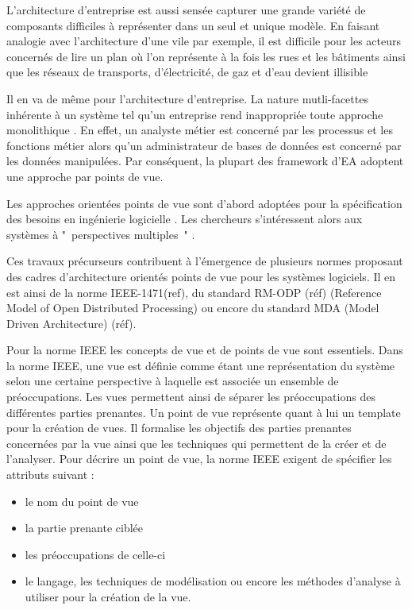 L'architecture d'entreprise est aussi sensée capturer une grande variété de composants difficiles à représenter dans un seul et unique modèle. 
En faisant analogie avec l'architecture d'une vile par exemple, il est difficile pour les acteurs concernés de lire un plan où l'on représente à la fois les rues et les bâtiments ainsi que les réseaux de transports, d'électricité, de gaz et d'eau devient illisible 

Il en va de même pour l'architecture d'entreprise. La nature mutli-facettes inhérente à un système tel qu'un entreprise rend inappropriée toute approche monolithique \cite{armour1999bigpicture}. En effet, un analyste métier est concerné par les 
processus et les fonctions métier alors qu'un administrateur de bases de données 
est concerné par les données manipulées. Par conséquent, la plupart des 
framework d'EA adoptent une approche par points de vue.

Les approches orientées points de vue sont d'abord adoptées pour la 
spécification des besoins en ingénierie logicielle \cite{mullery1979core}. Les 
chercheurs s'intéressent alors aux systèmes à "~perspectives multiples~" 
\cite{finkelstein1992viewpoints} \cite{kotonya1996requirements} 
\cite{nuseibeh1994multi} \cite{meyers1993representing}. 

Ces travaux précurseurs contribuent à l'émergence de plusieurs normes proposant 
des cadres d'architecture orientés points de vue pour les systèmes logiciels. Il 
en est ainsi de la norme IEEE-1471(ref), du standard RM-ODP (réf) (Reference 
Model of Open Distributed Processing) ou encore du standard MDA (Model Driven 
Architecture) (réf).

Pour la norme IEEE les concepts de vue et de points de vue sont 
essentiels. 
Dans la norme IEEE, une vue est définie comme étant une représentation du système selon une certaine perspective à laquelle est associée un ensemble de préoccupations. Les vues 
permettent ainsi de séparer les préoccupations des différentes parties 
prenantes. Un point de vue représente quant à lui un template pour la création de 
vues. Il formalise les objectifs des parties prenantes concernées par la vue 
ainsi que les techniques qui permettent de la créer et de l'analyser. Pour 
décrire un point de vue, la norme IEEE exigent de spécifier les attributs 
suivant :
\begin{itemize}
\item le nom du point de vue
\item la partie prenante ciblée
\item les préoccupations de celle-ci
\item le langage, les techniques de modélisation ou encore les méthodes 
d'analyse à utiliser pour la création de la vue. 
\end{itemize}

